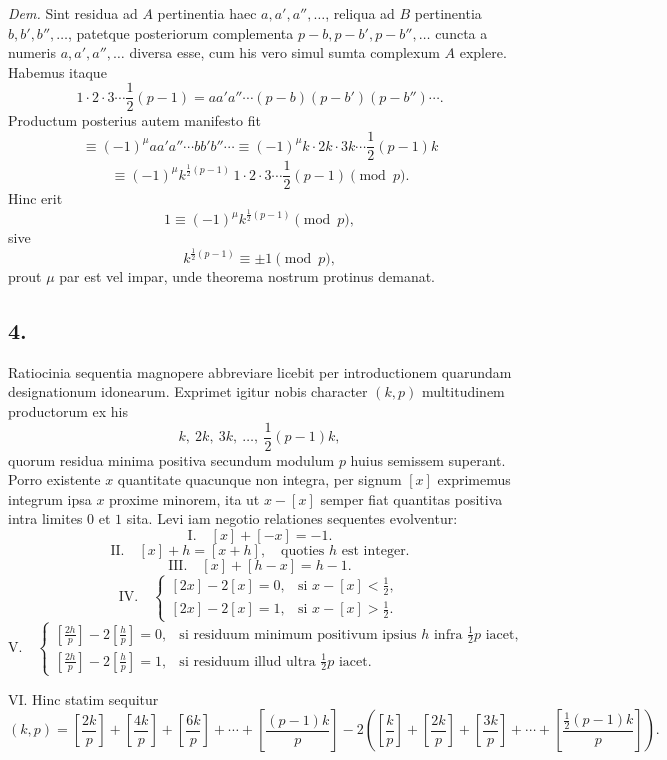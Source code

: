 \documentclass[12pt]{article}
\begin{document}
\emph{Dem.} Sint residua ad $A$ pertinentia haec $a,a',a'',\ldots$, reliqua ad $B$ pertinentia $b,b',b'',\ldots$, patetque posteriorum complementa $p-b,p-b',p-b'',\ldots$ cuncta a numeris $a,a',a'',\ldots$ diversa esse, cum his vero simul sumta complexum $A$ explere. Habemus itaque
\[
1\cdot2\cdot3\cdots \frac12(p-1)
=
aa'a''\cdots(p-b)(p-b')(p-b'')\cdots .
\]
Productum posterius autem manifesto fit
\[
\equiv (-1)^\mu aa'a''\cdots bb'b''\cdots
\equiv (-1)^\mu k\cdot 2k\cdot 3k\cdots \frac12(p-1)k
\]
\[
\equiv (-1)^\mu k^{\frac12(p-1)}\,1\cdot2\cdot3\cdots\frac12(p-1)\pmod p.
\]
Hinc erit
\[
1\equiv (-1)^\mu k^{\frac12(p-1)}\pmod p,
\]
sive
\[
k^{\frac12(p-1)}\equiv \pm1 \pmod p,
\]
prout $\mu$ par est vel impar, unde theorema nostrum protinus demanat.

\subsection*{4.}

Ratiocinia sequentia magnopere abbreviare licebit per introductionem quarundam designationum idonearum. Exprimet igitur nobis character $(k,p)$ multitudinem productorum ex his
\[
k,\ 2k,\ 3k,\ \ldots,\ \frac12(p-1)k,
\]
quorum residua minima positiva secundum modulum $p$ huius semissem superant. Porro existente $x$ quantitate quacunque non integra, per signum $[x]$ exprimemus integrum ipsa $x$ proxime minorem, ita ut $x-[x]$ semper fiat quantitas positiva intra limites $0$ et $1$ sita. Levi iam negotio relationes sequentes evolventur:
\[
\text{I.}\quad [x]+[-x]=-1.
\]
\[
\text{II.}\quad [x]+h=[x+h],\quad \text{quoties }h\text{ est integer.}
\]
\[
\text{III.}\quad [x]+[h-x]=h-1.
\]
\[
\text{IV.}\quad
\begin{cases}
[2x]-2[x]=0, & \text{si }x-[x]<\frac12,\\
[2x]-2[x]=1, & \text{si }x-[x]>\frac12.
\end{cases}
\]
\[
\text{V.}\quad
\begin{cases}
\left[\frac{2h}{p}\right]-2\left[\frac{h}{p}\right]=0, & \text{si residuum minimum positivum ipsius }h\text{ infra }\frac12p\text{ iacet},\\
\left[\frac{2h}{p}\right]-2\left[\frac{h}{p}\right]=1, & \text{si residuum illud ultra }\frac12p\text{ iacet}.
\end{cases}
\]

VI. Hinc statim sequitur
\[
(k,p)=
\left[\frac{2k}{p}\right]+\left[\frac{4k}{p}\right]+\left[\frac{6k}{p}\right]+\cdots+\left[\frac{(p-1)k}{p}\right]
-2\left(
\left[\frac{k}{p}\right]+\left[\frac{2k}{p}\right]+\left[\frac{3k}{p}\right]+\cdots+\left[\frac{\frac12(p-1)k}{p}\right]
\right).
\]
\end{document}

